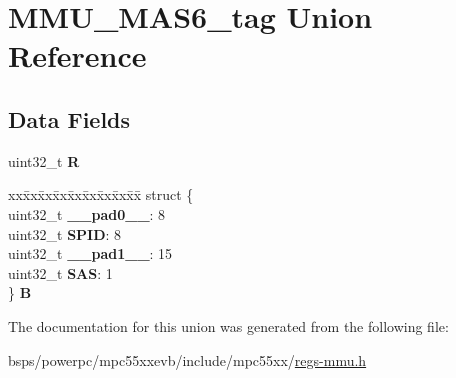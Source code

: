\hypertarget{unionMMU__MAS6__tag}{}\section{M\+M\+U\+\_\+\+M\+A\+S6\+\_\+tag Union Reference}
\label{unionMMU__MAS6__tag}
\subsection*{Data Fields}
\begin{DoxyCompactItemize}
\item 
\mbox{\label{unionMMU__MAS6__tag_a728cf4b43e49facff9f65e51d21fef37}} 
uint32\+\_\+t {\bfseries R}
\item 
\mbox{\label{unionMMU__MAS6__tag_a9bbc3071db946da74243c04723e016b2}} 
\begin{tabbing}
xx\=xx\=xx\=xx\=xx\=xx\=xx\=xx\=xx\=\kill
struct \{\\
\>uint32\_t {\bfseries \_\_pad0\_\_}: 8\\
\>uint32\_t {\bfseries SPID}: 8\\
\>uint32\_t {\bfseries \_\_pad1\_\_}: 15\\
\>uint32\_t {\bfseries SAS}: 1\\
\} {\bfseries B}\\

\end{tabbing}\end{DoxyCompactItemize}


The documentation for this union was generated from the following file\+:\begin{DoxyCompactItemize}
\item 
bsps/powerpc/mpc55xxevb/include/mpc55xx/\mbox{\hyperlink{regs-mmu_8h}{regs-\/mmu.\+h}}\end{DoxyCompactItemize}
